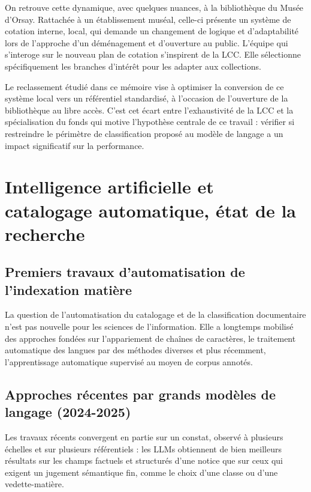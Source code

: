 On retrouve cette dynamique, avec quelques nuances, à la bibliothèque du Musée d'Orsay. Rattachée à un établissement muséal, celle-ci présente un système de cotation interne, local, qui demande un changement de logique et d'adaptabilité lors de l'approche d'un déménagement et d'ouverture au public. 
L'équipe qui s'interoge sur le nouveau plan de cotation s'inspirent de la LCC. Elle sélectionne spécifiquement les branches d'intérêt pour les adapter aux collections. 

 
 Le reclassement étudié dans ce mémoire vise à optimiser la conversion de ce système local vers un référentiel standardisé, à l’occasion de l’ouverture de la bibliothèque au libre accès.
C'est cet écart entre l'exhaustivité de la LCC et la spécialisation du fonds qui motive l'hypothèse centrale de ce travail : vérifier si restreindre le périmètre de classification proposé au modèle de langage a un impact significatif sur la performance. 


\section{Intelligence artificielle et catalogage automatique, état de la recherche}
\label{sec:ia-catalogage}

\subsection{Premiers travaux d'automatisation de l'indexation matière}
\label{sec:ia-premiers-travaux}

La question de l'automatisation du catalogage et de la classification documentaire n'est pas nouvelle pour les sciences de l'information. Elle a longtemps mobilisé des approches fondées sur l'appariement de chaînes de caractères, le traitement automatique des langues par des méthodes diverses et plus récemment, l'apprentissage automatique supervisé au moyen de corpus annotés. 


\subsection{Approches récentes par grands modèles de langage (2024-2025)}
\label{sec:ia-llm-recentes}

Les travaux récents convergent en partie sur un constat, observé à plusieurs échelles et sur plusieurs référentiels : les LLMs obtiennent de bien meilleurs résultats sur les champs factuels et structurés d'une notice que sur ceux qui exigent un jugement sémantique fin, comme le choix d'une classe ou d'une vedette-matière.

